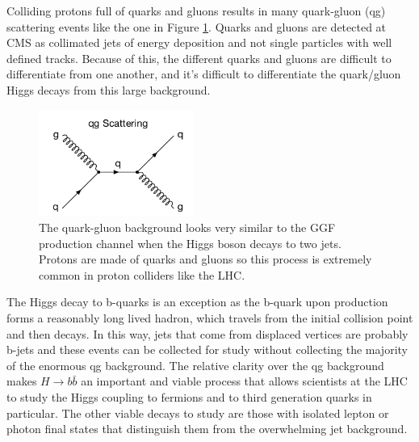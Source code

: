 Colliding protons full of quarks and gluons results in many quark-gluon (qg) scattering events like the one in Figure \ref{fig:qg}. Quarks and gluons are detected at CMS as collimated jets of energy deposition and not single particles with well defined tracks. Because of this, the different quarks and gluons are difficult to differentiate from one another, and it's difficult to differentiate the quark/gluon Higgs decays from this large background. 
\begin{figure}[h!]
  \centering
  \includegraphics[width=2in]{images/qg_scattering.png}
  \caption[Quark-gluon scattering.]
   {The quark-gluon background looks very similar to the GGF production channel when the Higgs boson decays to two jets. Protons are made of quarks and gluons so this process is extremely common in proton colliders like the LHC.}
\label{fig:qg}
\end{figure}
The Higgs decay to b-quarks is an exception as the b-quark upon production forms a reasonably long lived hadron, which travels from the initial collision point and then decays. In this way, jets that come from displaced vertices are probably b-jets and these events can be collected for study without collecting the majority of the enormous qg background. The relative clarity over the qg background makes $H\rightarrow b\bar{b}$ an important and viable process that allows scientists at the LHC to study the Higgs coupling to fermions and to third generation quarks in particular. The other viable decays to study are those with isolated lepton or photon final states that distinguish them from the overwhelming jet background. 
